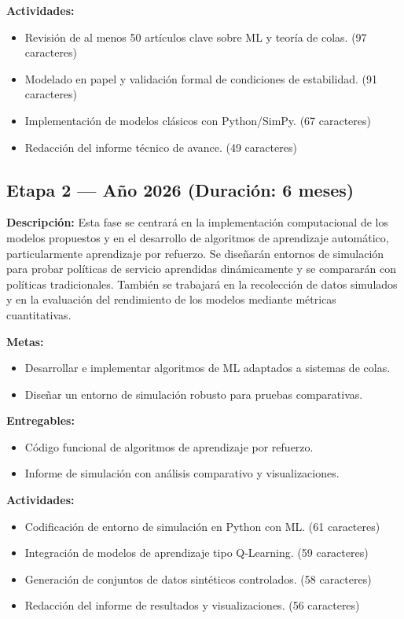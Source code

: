 \documentclass[12pt]{article}
\begin{document}
\textbf{Actividades:}
\begin{itemize}
  \item Revisión de al menos 50 artículos clave sobre ML y teoría de colas. (97 caracteres)
  \item Modelado en papel y validación formal de condiciones de estabilidad. (91 caracteres)
  \item Implementación de modelos clásicos con Python/SimPy. (67 caracteres)
  \item Redacción del informe técnico de avance. (49 caracteres)
\end{itemize}

\subsection*{Etapa 2 — Año 2026 (Duración: 6 meses)}
\textbf{Descripción:} Esta fase se centrará en la implementación computacional de los modelos propuestos y en el desarrollo de algoritmos de aprendizaje automático, particularmente aprendizaje por refuerzo. Se diseñarán entornos de simulación para probar políticas de servicio aprendidas dinámicamente y se compararán con políticas tradicionales. También se trabajará en la recolección de datos simulados y en la evaluación del rendimiento de los modelos mediante métricas cuantitativas.

\textbf{Metas:}
\begin{itemize}
  \item Desarrollar e implementar algoritmos de ML adaptados a sistemas de colas.
  \item Diseñar un entorno de simulación robusto para pruebas comparativas.
\end{itemize}

\textbf{Entregables:}
\begin{itemize}
  \item Código funcional de algoritmos de aprendizaje por refuerzo.
  \item Informe de simulación con análisis comparativo y visualizaciones.
\end{itemize}

\textbf{Actividades:}
\begin{itemize}
  \item Codificación de entorno de simulación en Python con ML. (61 caracteres)
  \item Integración de modelos de aprendizaje tipo Q-Learning. (59 caracteres)
  \item Generación de conjuntos de datos sintéticos controlados. (58 caracteres)
  \item Redacción del informe de resultados y visualizaciones. (56 caracteres)
\end{itemize}
\end{document}
